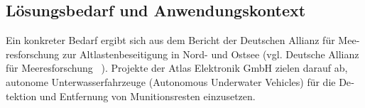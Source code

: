 \begin{otherlanguage}{ngerman}
\section{Lösungsbedarf und Anwendungskontext}

Ein konkreter Bedarf ergibt sich aus dem Bericht der \gls{Deutschen Allianz für Meeresforschung} zur Altlastenbeseitigung in Nord- und Ostsee (vgl. Deutsche Allianz für Meeresforschung ~\parencite{dam2024}). Projekte der Atlas Elektronik GmbH zielen darauf ab, autonome Unterwasserfahrzeuge (\gls{Autonomous Underwater Vehicle}s) für die Detektion und Entfernung von Munitionsresten einzusetzen. 
\end{otherlanguage}
